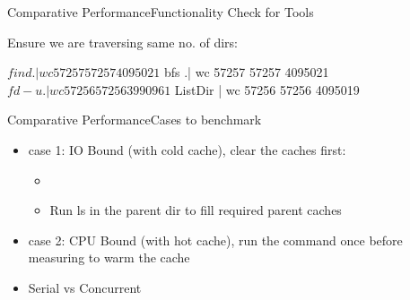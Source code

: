 \documentclass[17pt]{beamer}
\begin{document}
\begin{frame}[fragile]{Comparative Performance}{Functionality Check for Tools}

Ensure we are traversing same no. of dirs:
\begin{code}
  $ find .| wc
  57257   57257 4095021
  $ bfs .| wc
  57257   57257 4095021
  $ fd -u .| wc
  57256   57256 3990961
  $ ListDir | wc
  57256   57256 4095019
\end{code}
\end{frame}

\begin{frame}[fragile]{Comparative Performance}{Cases to benchmark}

\begin{itemize}
  \item case 1: IO Bound (with cold cache), clear the caches first:
\begin{itemize}
\item
{}
  \item Run ls in the parent dir to fill required parent caches
\end{itemize}
  \item case 2: CPU Bound (with hot cache), run the command once before
  measuring to warm the cache
  \item Serial vs Concurrent
\end{itemize}

\end{frame}
\end{document}
